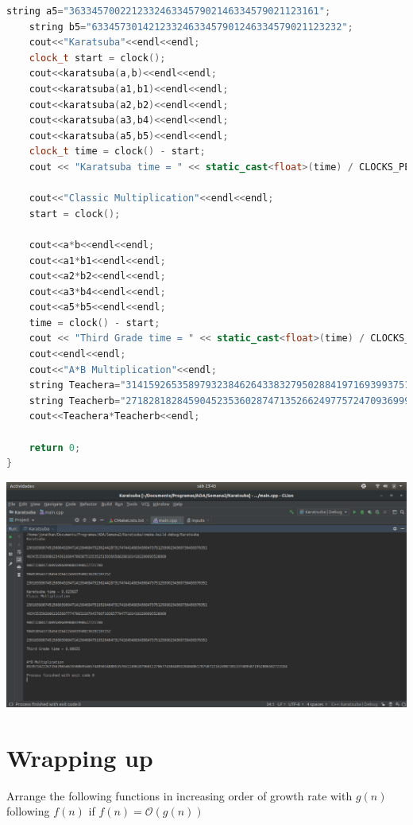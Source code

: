 \documentclass[12pt]{article}
\begin{document}
\begin{lstlisting}[language=C++, caption={Karatsuba}]
    string a5="36334570022123324633457902146334579021123161";
    string b5="63345730142123324633457901246334579021123232";
    cout<<"Karatsuba"<<endl<<endl;
    clock_t start = clock();
    cout<<karatsuba(a,b)<<endl<<endl;
    cout<<karatsuba(a1,b1)<<endl<<endl;
    cout<<karatsuba(a2,b2)<<endl<<endl;
    cout<<karatsuba(a3,b4)<<endl<<endl;
    cout<<karatsuba(a5,b5)<<endl<<endl;
    clock_t time = clock() - start;
    cout << "Karatsuba time = " << static_cast<float>(time) / CLOCKS_PER_SEC<< endl;

    cout<<"Classic Multiplication"<<endl<<endl;
    start = clock();

    cout<<a*b<<endl<<endl;
    cout<<a1*b1<<endl<<endl;
    cout<<a2*b2<<endl<<endl;
    cout<<a3*b4<<endl<<endl;
    cout<<a5*b5<<endl<<endl;
    time = clock() - start;
    cout << "Third Grade time = " << static_cast<float>(time) / CLOCKS_PER_SEC<< endl;
    cout<<endl<<endl;
    cout<<"A*B Multiplication"<<endl;
    string Teachera="3141592653589793238462643383279502884197169399375105820974944592";
    string Teacherb="2718281828459045235360287471352662497757247093699959574966967627";
    cout<<Teachera*Teacherb<<endl;

    return 0;
}

\end{lstlisting}


\includegraphics[width=\textwidth]{Src/Pantalla.png}\\

\section{Wrapping up}

Arrange the following functions in increasing order of growth rate with $g(n)$ following $f(n)$ if $f(n) = \mathcal{O}(g(n))$
\end{document}
